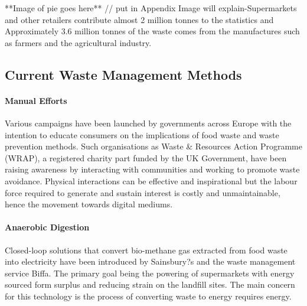 \documentclass[a4paper, 11pt]{article}
\begin{document}
\vspace{\baselineskip}

**Image of pie goes here** // put in Appendix
Image will explain-Supermarkets and other retailers contribute almost 2 million tonnes to the statistics and Approximately 3.6 million tonnes of the waste comes from the manufactures such as farmers and the agricultural industry. 

\vspace{\baselineskip}
\vspace{\baselineskip}
\vspace{\baselineskip}

\subsection{Current Waste Management Methods}

\paragraph{Manual Efforts}
Various campaigns have been launched by governments across Europe with the intention to educate consumers on the implications of food waste and waste prevention methods. Such organisations as Waste \& Resources Action Programme (WRAP), a registered charity part funded by the UK Government, have been raising awareness by interacting with communities and working to promote waste avoidance. Physical interactions can be effective and inspirational but the labour force required to generate and sustain interest is costly and unmaintainable, hence the movement towards digital mediums.

\paragraph{Anaerobic Digestion}
Closed-loop solutions that convert bio-methane gas extracted from food waste into electricity have been introduced by Sainsbury?s and the waste management service Biffa. The primary goal being the powering of supermarkets with energy sourced form surplus and reducing strain on the landfill sites. The main concern for this technology is the process of converting waste to energy requires energy. 
\end{document}
